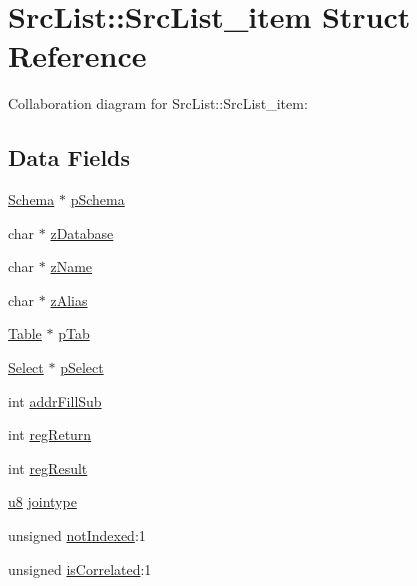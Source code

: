 \hypertarget{struct_src_list_1_1_src_list__item}{}\section{Src\+List\+:\+:Src\+List\+\_\+item Struct Reference}
\label{struct_src_list_1_1_src_list__item}


Collaboration diagram for Src\+List\+:\+:Src\+List\+\_\+item\+:
\subsection*{Data Fields}
\begin{DoxyCompactItemize}
\item 
\hyperlink{struct_schema}{Schema} $\ast$ \hyperlink{struct_src_list_1_1_src_list__item_ac262c2ca980f0326edbe82bbe7fda205}{p\+Schema}
\item 
char $\ast$ \hyperlink{struct_src_list_1_1_src_list__item_a576d35ab74a5170a112731199a571c58}{z\+Database}
\item 
char $\ast$ \hyperlink{struct_src_list_1_1_src_list__item_a661118d86ac4127d40bf3be78d92117d}{z\+Name}
\item 
char $\ast$ \hyperlink{struct_src_list_1_1_src_list__item_a79a6d76e95d1b3876371f713b32da1c5}{z\+Alias}
\item 
\hyperlink{struct_table}{Table} $\ast$ \hyperlink{struct_src_list_1_1_src_list__item_a11b1abc167f386db2ab7fc634c880c26}{p\+Tab}
\item 
\hyperlink{struct_select}{Select} $\ast$ \hyperlink{struct_src_list_1_1_src_list__item_ab0e0ccc47de126415a7ad889ff1d228a}{p\+Select}
\item 
int \hyperlink{struct_src_list_1_1_src_list__item_a5673cf13e4e7b5bdff5c739a2074fe99}{addr\+Fill\+Sub}
\item 
int \hyperlink{struct_src_list_1_1_src_list__item_a02d21bd92b68681173d2e26e9525d0ae}{reg\+Return}
\item 
int \hyperlink{struct_src_list_1_1_src_list__item_aa04c05848c8d70309d6bb0d3d51df5e5}{reg\+Result}
\item 
\hyperlink{sqlite3_8c_a74a0f6424ae628af25f23f0a35f6ead3}{u8} \hyperlink{struct_src_list_1_1_src_list__item_aff0cce403d435da475dee508e333353b}{jointype}
\item 
unsigned \hyperlink{struct_src_list_1_1_src_list__item_a26908f376e50467dcb8365eb7a75c0f4}{not\+Indexed}\+:1
\item 
unsigned \hyperlink{struct_src_list_1_1_src_list__item_aa4f7751c77c8ec69870a70999fb2dcde}{is\+Correlated}\+:1

\end{DoxyCompactItemize}
